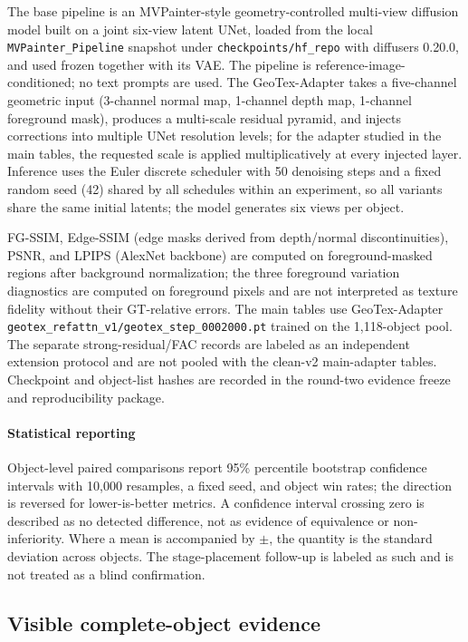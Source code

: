 \documentclass[times,twocolumn,final]{elsarticle}
\begin{document}
The base pipeline is an MVPainter-style geometry-controlled multi-view diffusion model built on a joint six-view latent UNet, loaded from the local \texttt{MVPainter\_Pipeline} snapshot under \texttt{checkpoints/hf\_repo} with diffusers 0.20.0, and used frozen together with its VAE. The pipeline is reference-image-conditioned; no text prompts are used. The GeoTex-Adapter takes a five-channel geometric input (3-channel normal map, 1-channel depth map, 1-channel foreground mask), produces a multi-scale residual pyramid, and injects corrections into multiple UNet resolution levels; for the adapter studied in the main tables, the requested scale is applied multiplicatively at every injected layer. Inference uses the Euler discrete scheduler with 50 denoising steps and a fixed random seed (42) shared by all schedules within an experiment, so all variants share the same initial latents; the model generates six views per object.

FG-SSIM, Edge-SSIM (edge masks derived from depth/normal discontinuities), PSNR, and LPIPS (AlexNet backbone) are computed on foreground-masked regions after background normalization; the three foreground variation diagnostics are computed on foreground pixels and are not interpreted as texture fidelity without their GT-relative errors. The main tables use GeoTex-Adapter \texttt{geotex\_refattn\_v1/geotex\_step\_0002000.pt} trained on the 1{,}118-object pool. The separate strong-residual/FAC records are labeled as an independent extension protocol and are not pooled with the clean-v2 main-adapter tables. Checkpoint and object-list hashes are recorded in the round-two evidence freeze and reproducibility package.

\paragraph{Statistical reporting}
Object-level paired comparisons report 95\% percentile bootstrap confidence intervals with 10{,}000 resamples, a fixed seed, and object win rates; the direction is reversed for lower-is-better metrics. A confidence interval crossing zero is described as no detected difference, not as evidence of equivalence or non-inferiority. Where a mean is accompanied by $\pm$, the quantity is the standard deviation across objects. The stage-placement follow-up is labeled as such and is not treated as a blind confirmation.

\subsection{Visible complete-object evidence}
\label{subsec:visual}
\end{document}
